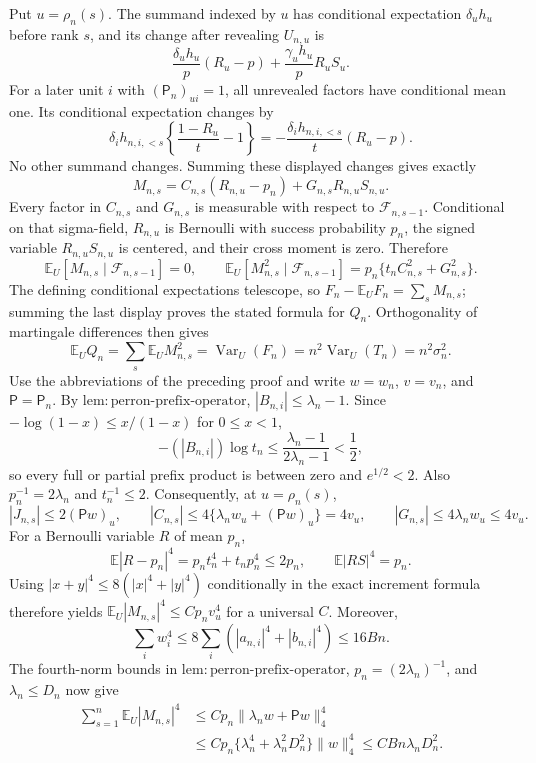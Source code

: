 Put \(u=\rho_n(s)\).  The summand indexed by \(u\) has conditional expectation \(\delta_u h_u\) before rank \(s\), and its change after revealing \(U_{n,u}\) is
\[
 \frac{\delta_uh_u}{p}(R_u-p)+\frac{\gamma_uh_u}{p}R_uS_u.
\]
For a later unit \(i\) with \((\mathsf P_n)_{u i}=1\), all unrevealed factors have conditional mean one.  Its conditional expectation changes by
\[
 \delta_i h_{n,i,<s}\left\{\frac{1-R_u}{t}-1\right\}
 =-\frac{\delta_i h_{n,i,<s}}{t}(R_u-p).
\]
No other summand changes.  Summing these displayed changes gives exactly
\[
 M_{n,s}=C_{n,s}(R_{n,u}-p_n)+G_{n,s}R_{n,u}S_{n,u}.
\]
Every factor in \(C_{n,s}\) and \(G_{n,s}\) is measurable with respect to \(\mathcal F_{n,s-1}\).  Conditional on that sigma-field, \(R_{n,u}\) is Bernoulli with success probability \(p_n\), the signed variable \(R_{n,u}S_{n,u}\) is centered, and their cross moment is zero.  Therefore
\[
 \mathbb E_U[M_{n,s}\mid\mathcal F_{n,s-1}]=0,\qquad
 \mathbb E_U[M_{n,s}^2\mid\mathcal F_{n,s-1}]
 =p_n\{t_nC_{n,s}^2+G_{n,s}^2\}.
\]
The defining conditional expectations telescope, so \(F_n-\mathbb E_UF_n=\sum_sM_{n,s}\); summing the last display proves the stated formula for \(Q_n\).  Orthogonality of martingale differences then gives
\[
 \mathbb E_UQ_n=\sum_s\mathbb E_UM_{n,s}^2
 =\operatorname{Var}_U(F_n)=n^2\operatorname{Var}_U(T_n)=n^2\sigma_n^2.
\]
Use the abbreviations of the preceding proof and write \(w=w_n\), \(v=v_n\), and \(\mathsf P=\mathsf P_n\).  By \(\mathrm{lem:perron\text{-}prefix\text{-}operator}\), \(|B_{n,i}|\le\lambda_n-1\).  Since \(-\log(1-x)\le x/(1-x)\) for \(0\le x<1\),
\[
 -(|B_{n,i}|)\log t_n
 \le\frac{\lambda_n-1}{2\lambda_n-1}<\frac12,
\]
so every full or partial prefix product is between zero and \(e^{1/2}<2\).  Also \(p_n^{-1}=2\lambda_n\) and \(t_n^{-1}\le2\).  Consequently, at \(u=\rho_n(s)\),
\[
 |J_{n,s}|\le2(\mathsf Pw)_u,\qquad
 |C_{n,s}|\le4\{\lambda_nw_u+(\mathsf Pw)_u\}=4v_u,\qquad
 |G_{n,s}|\le4\lambda_nw_u\le4v_u.
\]
For a Bernoulli variable \(R\) of mean \(p_n\),
\[
 \mathbb E|R-p_n|^4=p_nt_n^4+t_np_n^4\le2p_n,\qquad
 \mathbb E|RS|^4=p_n.
\]
Using \(|x+y|^4\le8(|x|^4+|y|^4)\) conditionally in the exact increment formula therefore yields \(\mathbb E_U|M_{n,s}|^4\le C p_nv_u^4\) for a universal \(C\).  Moreover,
\[
 \sum_iw_i^4\le8\sum_i(|a_{n,i}|^4+|b_{n,i}|^4)\le16Bn.
\]
The fourth-norm bounds in \(\mathrm{lem:perron\text{-}prefix\text{-}operator}\), \(p_n=(2\lambda_n)^{-1}\), and \(\lambda_n\le D_n\) now give
\[
 \begin{aligned}
 \sum_{s=1}^n\mathbb E_U|M_{n,s}|^4
 &\le Cp_n\|\lambda_nw+\mathsf Pw\|_4^4\\
 &\le Cp_n\{\lambda_n^4+\lambda_n^2D_n^2\}\|w\|_4^4
 \le C Bn\lambda_nD_n^2.
 \end{aligned}
\]

